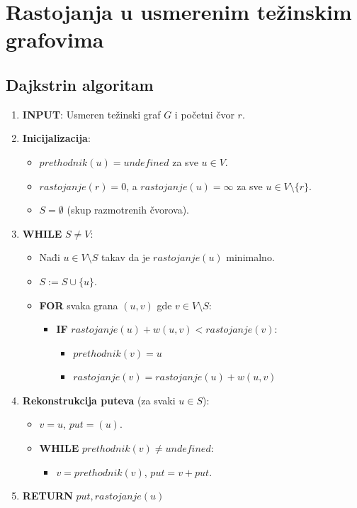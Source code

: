 \documentclass[a4paper,12pt,twoside]{report}
\numberwithin{algorithm}{section}
\begin{document}
\section{Rastojanja u usmerenim težinskim grafovima}
\subsection{Dajkstrin algoritam}
\begin{algorithm}[ht]
    \caption{Dajkstrin algoritam}
    \begin{enumerate}
        \item \textbf{INPUT}: Usmeren težinski graf $G$ i početni čvor $r$.
        \item \textbf{Inicijalizacija}:
        \begin{itemize}
            \item $prethodnik(u) = undefined$ za sve $u \in V$.
            \item $rastojanje(r) = 0$, a $rastojanje(u) = \infty$ za sve $u \in V \setminus \{r\}$.
            \item $S = \emptyset$ (skup razmotrenih čvorova).
        \end{itemize}
        \item \textbf{WHILE} $S \neq V$:
        \begin{itemize}
            \item Nađi $u \in V \setminus S$ takav da je $rastojanje(u)$ minimalno.
            \item $S := S \cup \{u\}$.
            \item \textbf{FOR} svaka grana $(u, v)$ gde $v \in V \setminus S$:
            \begin{itemize}
                \item \textbf{IF} $rastojanje(u) + w(u, v) < rastojanje(v)$:
                \begin{itemize}
                    \item $prethodnik(v) = u$
                    \item $rastojanje(v) = rastojanje(u) + w(u, v)$
                \end{itemize}
            \end{itemize}
        \end{itemize}
        \item \textbf{Rekonstrukcija puteva} (za svaki $u \in S$):
        \begin{itemize}
            \item $v = u$, $put = (u)$.
            \item \textbf{WHILE} $prethodnik(v) \neq undefined$:
            \begin{itemize}
                \item $v = prethodnik(v)$, $put = v + put$.
            \end{itemize}
        \end{itemize}
        \item \textbf{RETURN} $put, rastojanje(u)$
    \end{enumerate}
\end{algorithm}
\end{document}
